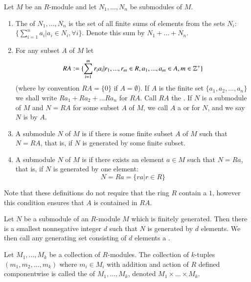 \documentclass[12pt, a4paper, oneside, openright, titlepage]{book}
\begin{document}
\begin{defn}
    Let $M$ be an $R$-module and let $N_1,...,N_n$ be submodules of $M$.
    \begin{enumerate}
        \item The  of $N_1,...,N_n$ is the set of all finite sums of elements from the sets $N_i$: $\{\sum_{i=1}^na_i\vert a_i \in N_i,\forall i\}$. Denote this sum by $N_1+\hdots + N_n$.
        \item For any subset $A$ of $M$ let \begin{equation*}
                RA := \{\sum_{i=1}^mr_ia_i\vert r_1,...,r_m \in R,a_1,...,a_m \in A, m \in \mathbb Z^+\}
        \end{equation*}
            (where by convention $RA = \{0\}$ if $A = \emptyset$). If $A$ is the finite set $\{a_1,a_2,...,a_n\}$ we shall write $Ra_1+Ra_2+\hdots Ra_n$ for $RA$. Call $RA$ the . If $N$ is a submodule of $M$ and $N = RA$ for some subset $A$ of $M$, we call $A$ a  or  for $N$, and we say $N$ is  by $A$.
        \item A submodule $N$ of $M$ is  if there is some finite subset $A$ of $M$ such that $N = RA$, that is, if $N$ is generated by some finite subset.
        \item A submodule $N$ of $M$ is  if there exists an element $a \in M$ such that $N = Ra$, that is, if $N$ is generated by one element: \begin{equation*}
                N = Ra = \{ra\vert r \in R\}
        \end{equation*}
    \end{enumerate}
\end{defn}

Note that these definitions do not require that the ring $R$ contain a $1$, however this condition ensures that $A$ is contained in $RA$.

\begin{rmk}
    Let $N$ be a submodule of an $R$-module $M$ which is finitely generated. Then there is a smallest nonnegative integer $d$ such that $N$ is generated by $d$ elements. We then call any generating set consisting of $d$ elements a .
\end{rmk}

\begin{defn}
    Let $M_1,...,M_k$ be a collection of $R$-modules. The collection of $k$-tuples $(m_1,m_2,...,m_k)$ where $m_i \in M_i$ with addition and action of $R$ defined componentwise is called the  of $M_1,...,M_k$, denoted $M_1\times ...\times M_k$.
\end{defn}
\end{document}
